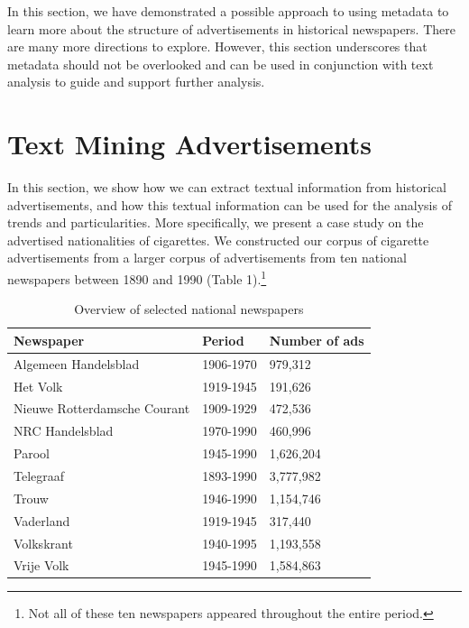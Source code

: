 \documentclass[USenglish]{article}
\begin{document}
In this section, we have demonstrated a possible approach to using metadata to learn more about the structure of advertisements in historical newspapers. There are many more directions to explore. However, this section underscores that metadata should not be overlooked and can be used in conjunction with text analysis to guide and support further analysis. 

\section{Text Mining Advertisements}
In this section, we show how we can extract textual information from historical advertisements, and how this textual information can be used for the analysis of trends and particularities. More specifically, we present a case study on the advertised nationalities of cigarettes. We constructed our corpus of cigarette advertisements from a larger corpus of advertisements from ten national newspapers between 1890 and 1990 (Table 1).\footnote{Not all of these ten newspapers appeared throughout the entire period.}

\begin{table}
  \centering
  \begin{tabular}{lll}
    \toprule
    \textbf{Newspaper} &
    \textbf{Period} &
    \textbf{Number of ads} \\
    \midrule
    Algemeen Handelsblad         & 1906-1970 &   979,312 \\
    Het Volk                     & 1919-1945 &   191,626 \\
    Nieuwe Rotterdamsche Courant & 1909-1929 &   472,536 \\
    NRC Handelsblad              & 1970-1990 &   460,996 \\
    Parool                       & 1945-1990 & 1,626,204 \\
    Telegraaf                    & 1893-1990 & 3,777,982 \\
    Trouw                        & 1946-1990 & 1,154,746 \\
    Vaderland                    & 1919-1945 &   317,440 \\
    Volkskrant                   & 1940-1995 & 1,193,558 \\
    Vrije Volk                   & 1945-1990 & 1,584,863 \\
    \bottomrule 
  \end{tabular}
  \caption{Overview of selected national newspapers}
\end{table}
\end{document}
